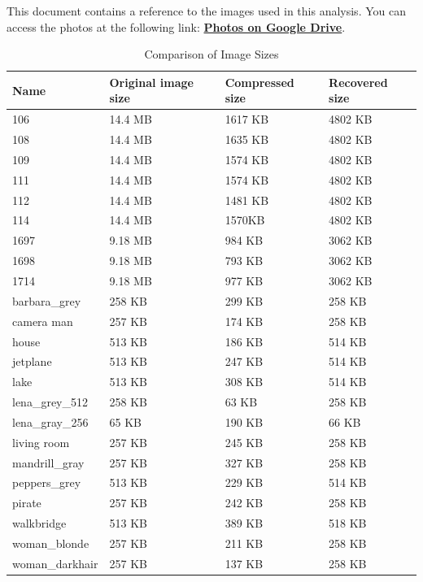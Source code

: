\documentclass{article}
\begin{document}
This document contains a reference to the images used in this analysis. You can access the photos at the following link:  
\href{https://drive.google.com/drive/folders/1rpRNlFg8iFSTTgFFgbw2oKc3_D-u5A7l?usp=drive_link}{\textbf{Photos on Google Drive}}.
\begin{table}
\centering
\caption{Comparison of Image Sizes}
\label{tab:image_sizes}
\begin{tabular}{llll}
\toprule
          Name & Original image size & Compressed size & Recovered size \\
\midrule
           106 &             14.4 MB &         1617 KB &        4802 KB \\
           108 &             14.4 MB &         1635 KB &        4802 KB \\
           109 &             14.4 MB &         1574 KB &        4802 KB \\
           111 &             14.4 MB &         1574 KB &        4802 KB \\
           112 &             14.4 MB &         1481 KB &        4802 KB \\
           114 &             14.4 MB &          1570KB &        4802 KB \\
          1697 &             9.18 MB &          984 KB &        3062 KB \\
          1698 &             9.18 MB &          793 KB &        3062 KB \\
          1714 &             9.18 MB &          977 KB &        3062 KB \\
  barbara\_grey &              258 KB &          299 KB &         258 KB \\
    camera man &              257 KB &          174 KB &         258 KB \\
         house &              513 KB &          186 KB &         514 KB \\
      jetplane &              513 KB &          247 KB &         514 KB \\
          lake &              513 KB &          308 KB &         514 KB \\
 lena\_grey\_512 &              258 KB &           63 KB &         258 KB \\
 lena\_gray\_256 &               65 KB &          190 KB &          66 KB \\
   living room &              257 KB &          245 KB &         258 KB \\
 mandrill\_gray &              257 KB &          327 KB &         258 KB \\
  peppers\_grey &              513 KB &          229 KB &         514 KB \\
        pirate &              257 KB &          242 KB &         258 KB \\
    walkbridge &              513 KB &          389 KB &         518 KB \\
  woman\_blonde &              257 KB &          211 KB &         258 KB \\
woman\_darkhair &              257 KB &          137 KB &         258 KB \\
\bottomrule
\end{tabular}
\end{table}
\end{document}
